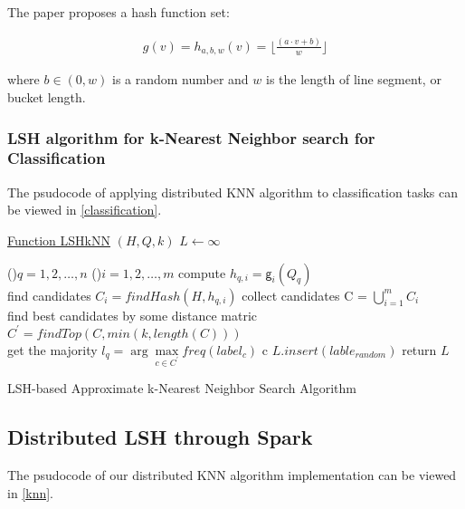\documentclass[letterpaper,twocolumn,10pt]{article}
\newcommand{\floor}[1]{\lfloor #1 \rfloor}
\theoremstyle{definition}
\begin{document}
The paper \cite{datar2004locality} proposes a hash function set:



\begin{align*}
g(v) = h_{a,b,w}(v) = \floor{\frac{(a\cdot v + b)}{w} }
\end{align*}

where $b \in (0, w)$ is a random number and $w$ is the length of line segment, or bucket length.

\subsubsection{LSH algorithm for k-Nearest Neighbor search for Classification}
The psudocode of applying distributed KNN algorithm to classification tasks can be viewed in \ref{classification}.

\begin{algorithm}
	\underline{Function LSHkNN} $(H, Q, k)$\;
	$L \leftarrow \infty$
	
	\For(){$q=1, 2, \ldots, n$ }{
		\For(){$i=1, 2, \ldots, m$}{        
			compute $h_{q, i} = \mathsf{g}_i(Q_q)$ \\
			find candidates $C_i = findHash(H, h_{q, i})$
		}
		collect candidates C = $\bigcup\limits_{i=1}^{m} C_{i}$ \\

		{
			find best candidates by some distance matric $C^{\prime} = findTop(C, min(k, length(C)))$ \\
			get the majority $l_q = \arg \max\limits_{c \in C^{\prime}} freq(label_c)$
			c
		}
		{
			$L.insert(lable_{random})$
		}
	}
	return $L$\;
		
	\caption{LSH-based Approximate k-Nearest Neighbor Search Algorithm}
	\label{classification}
\end{algorithm}
\subsection{Distributed LSH through Spark}

The psudocode of our distributed KNN algorithm implementation can be viewed in \ref{knn}.
\end{document}
